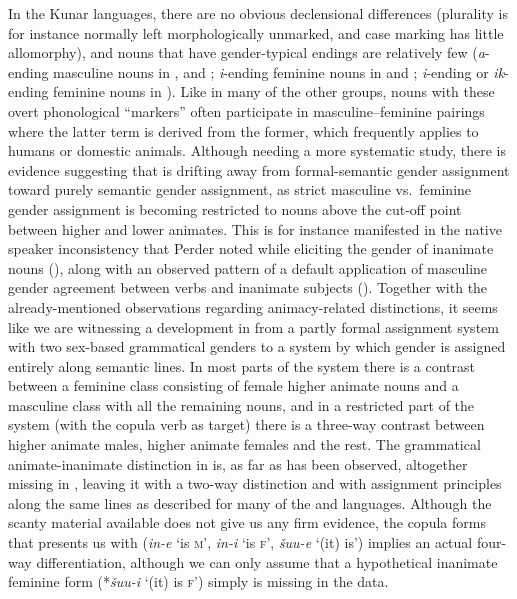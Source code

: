 \documentclass[output=collectionpaper]{langsci/langscibook}
\begin{document}
In the Kunar languages, there are no obvious declensional differences (plurality is for instance normally left morphologically unmarked, and case marking has little allomorphy), and nouns that have gender-typical endings are relatively few (\textit{a}{}-ending masculine nouns in ,  and ; \textit{i}{}-ending feminine nouns in  and ; \textit{i}{}-ending or \textit{ik}{}-ending feminine nouns in ). Like in many of the other groups, nouns with these overt phonological ``markers'' often participate in masculine--feminine pairings where the latter term is derived from the former, which frequently applies to humans or domestic animals. Although needing a more systematic study, there is evidence suggesting that  is drifting away from formal-semantic gender assignment toward purely semantic gender assignment, as strict masculine vs.\ feminine gender assignment is becoming restricted to nouns above the cut-off point between higher and lower animates. This is for instance manifested in the native speaker inconsistency that Perder noted while eliciting the gender of inanimate nouns (\citeyear[54]{Perder2013}), along with an observed pattern of a default application of masculine gender agreement between verbs and inanimate subjects (\citeyear[111]{Perder2013}). Together with the already-mentioned observations regarding animacy-related distinctions, it seems like we are witnessing a development in  from a partly formal assignment system with two sex-based grammatical genders to a system by which gender is assigned entirely along semantic lines. In most parts of the system there is a contrast between a feminine class consisting of female higher animate nouns and a masculine class with all the remaining nouns, and in a restricted part of the system (with the copula verb as target) there is a three-way contrast between higher animate males, higher animate females and the rest. The grammatical animate-inanimate distinction in  is, as far as has been observed, altogether missing in , leaving it with a two-way distinction and with assignment principles along the same lines as described for many of the  and  languages. Although the scanty material available does not give us any firm evidence, the  copula forms that \citet[255]{Morgenstierne1945} presents us with (\textit{in-e} `is \textsc{m}', \textit{in-i} `is \textsc{f}', \textit{šuu-e} `(it) is') implies an actual four-way differentiation, although we can only assume that a hypothetical inanimate feminine form (*\textit{šuu-i} `(it) is \textsc{f}') simply is missing in the data.
\end{document}
